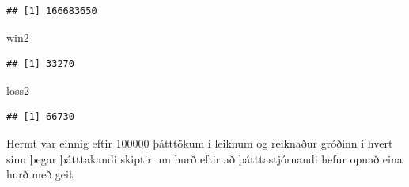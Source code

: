 \documentclass[
]{article}
\newenvironment{Shaded}{\begin{snugshade}}{\end{snugshade}}
\newcommand{\NormalTok}[1]{#1}
\begin{document}
\begin{verbatim}
## [1] 166683650
\end{verbatim}

\begin{Shaded}
\begin{Highlighting}[]
\NormalTok{win2}
\end{Highlighting}
\end{Shaded}

\begin{verbatim}
## [1] 33270
\end{verbatim}

\begin{Shaded}
\begin{Highlighting}[]
\NormalTok{loss2}
\end{Highlighting}
\end{Shaded}

\begin{verbatim}
## [1] 66730
\end{verbatim}

Hermt var einnig eftir 100000 þátttökum í leiknum og reiknaður gróðinn í
hvert sinn þegar þátttakandi skiptir um hurð eftir að þátttastjórnandi
hefur opnað eina hurð með geit
\end{document}
